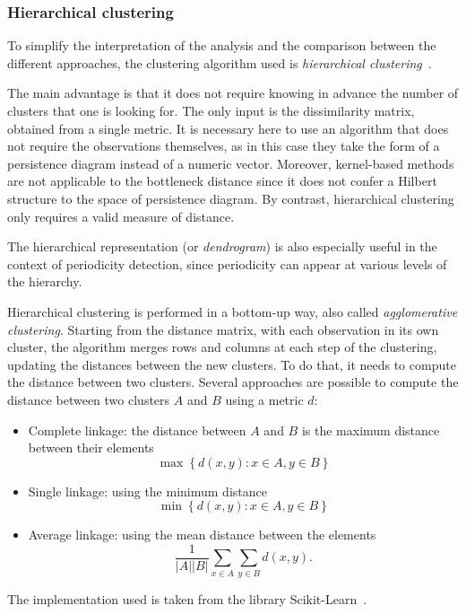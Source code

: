 \documentclass[a4paper,11pt,openany,extrafontsizes]{memoir}
\begin{document}
\subsubsection{Hierarchical clustering}%
\label{sec:hier-clust}

To simplify the interpretation of the analysis and the comparison
between the different approaches, the clustering algorithm used is
\emph{hierarchical clustering}~\cite{hastie_elements_2009}.

The main advantage is that it does not require knowing in advance the
number of clusters that one is looking for. The only input is the
dissimilarity matrix, obtained from a single metric. It is necessary
here to use an algorithm that does not require the observations
themselves, as in this case they take the form of a persistence
diagram instead of a numeric vector. Moreover, kernel-based methods
are not applicable to the bottleneck distance since it does not confer
a Hilbert structure to the space of persistence diagram. By contrast,
hierarchical clustering only requires a valid measure of distance.

The hierarchical representation (or \emph{dendrogram}) is also
especially useful in the context of periodicity detection, since
periodicity can appear at various levels of the hierarchy.

Hierarchical clustering is performed in a bottom-up way, also called
\emph{agglomerative clustering}. Starting from the distance matrix,
with each observation in its own cluster, the algorithm merges rows
and columns at each step of the clustering, updating the distances
between the new clusters. To do that, it needs to compute the distance
between two clusters. Several approaches are possible to compute the
distance between two clusters $A$ and $B$ using a metric $d$:
\begin{itemize}
\item Complete linkage: the distance between $A$ and $B$ is the
  maximum distance between their elements
  \[ \max\left\{ d(x,y) : x\in A, y\in B \right\} \]
\item Single linkage: using the minimum distance
  \[ \min\left\{ d(x,y) : x\in A, y\in B \right\} \]
\item Average linkage: using the mean distance between the elements
  \[ \frac{1}{|A| |B|} \sum_{x\in A} \sum_{y\in B} d(x,y). \]
\end{itemize}

The implementation used is taken from the library
Scikit-Learn~\cite{pedregosa_scikit-learn:_2011}.
\end{document}
